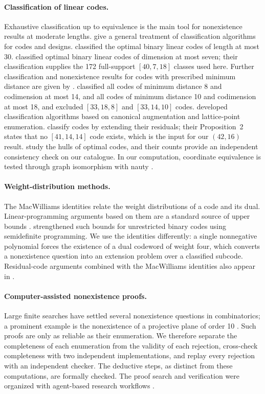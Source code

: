 \paragraph{Classification of linear codes.}
Exhaustive classification up to equivalence is the main tool for nonexistence results at moderate lengths. \citet{kaski2006} give a general treatment of classification algorithms for codes and designs. \citet{jaffe2000} classified the optimal binary linear codes of length at most 30. \citet{bouyukliev2001} classified optimal binary linear codes of dimension at most seven; their classification supplies the 172 full-support $[40,7,18]$ classes used here. Further classification and nonexistence results for codes with prescribed minimum distance are given by \citet{feulner2014}. \citet{bouyukliev2011} classified all codes of minimum distance 8 and codimension at most 14, and all codes of minimum distance 10 and codimension at most 18, and excluded $[33,18,8]$ and $[33,14,10]$ codes. \citet{bouyukliev2021} developed classification algorithms based on canonical augmentation and lattice-point enumeration. \citet{bouyuklieva2020} classify codes by extending their residuals; their Proposition~2 states that no $[41,14,14]$ code exists, which is the input for our $(42,16)$ result. \citet{bouyuklieva2025} study the hulls of optimal codes, and their counts provide an independent consistency check on our catalogue. In our computation, coordinate equivalence is tested through graph isomorphism with nauty \citep{mckay2014}.

\paragraph{Weight-distribution methods.}
The MacWilliams identities \citep{macwilliams1963} relate the weight distributions of a code and its dual. Linear-programming arguments based on them are a standard source of upper bounds \citep{macwilliams1977}. \citet{schrijver2005} strengthened such bounds for unrestricted binary codes using semidefinite programming. We use the identities differently: a single nonnegative polynomial forces the existence of a dual codeword of weight four, which converts a nonexistence question into an extension problem over a classified subcode. Residual-code arguments combined with the MacWilliams identities also appear in \citet{kurz2021}.

\paragraph{Computer-assisted nonexistence proofs.}
Large finite searches have settled several nonexistence questions in combinatorics; a prominent example is the nonexistence of a projective plane of order 10 \citep{lam1989}. Such proofs are only as reliable as their enumeration. We therefore separate the completeness of each enumeration from the validity of each rejection, cross-check completeness with two independent implementations, and replay every rejection with an independent checker. The deductive steps, as distinct from these computations, are formally checked. The proof search and verification were organized with agent-based research workflows \citep{yang2026aris,mathrsi}.
